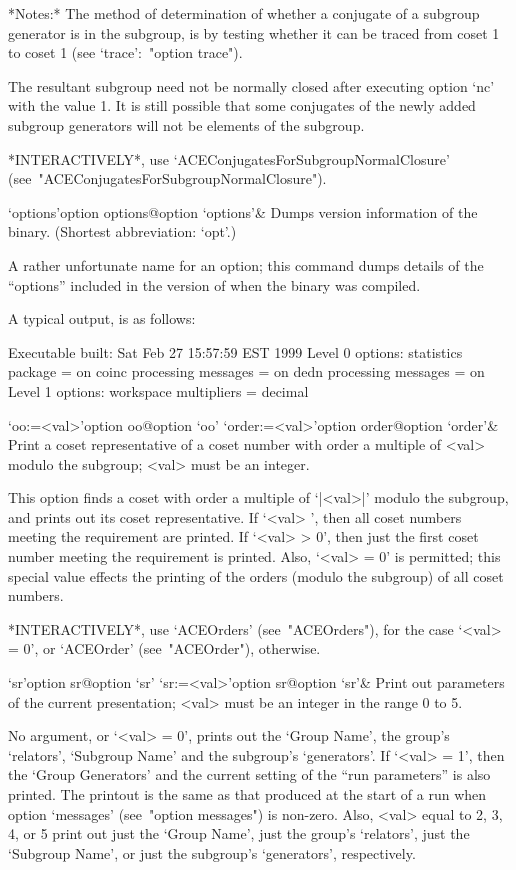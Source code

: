 *Notes:*
The method of determination of  whether  a  conjugate  of  a  subgroup
generator is in the subgroup, is by testing whether it can  be  traced
from coset 1 to coset 1  (see  `trace':~"option trace").

The resultant subgroup need not be  normally  closed  after  executing
option `nc'  with  the  value  1.  It  is  still  possible  that  some
conjugates of the newly added subgroup generators will not be elements
of the subgroup.

*INTERACTIVELY*,      use      `ACEConjugatesForSubgroupNormalClosure'
(see~"ACEConjugatesForSubgroupNormalClosure").

\>`options'{option options}@{option `options'}&
Dumps version information of the {\ACE} binary.
(Shortest abbreviation: `opt'.)

A rather unfortunate name for an option; this command dumps details of
the ``options'' included in the version  of  {\ACE}  when  the  {\ACE}
binary was compiled.

A typical output, is as follows:

\begintt
Executable built:
  Sat Feb 27 15:57:59 EST 1999
Level 0 options:
  statistics package = on
  coinc processing messages = on
  dedn processing messages = on
Level 1 options:
  workspace multipliers = decimal
\endtt

\>`oo:=<val>'{option oo}@{option `oo'}
\>`order:=<val>'{option order}@{option `order'}&
Print a coset representative of a coset number with order  a  multiple
of <val> modulo the subgroup; <val> must be an integer.

This option finds a coset with order a multiple  of  `|<val>|'  modulo
the subgroup, and prints out its coset representative.  If  `<val>  ', then all coset numbers meeting the  requirement  are  printed.  If
`<val> > 0', then just the first coset number meeting the  requirement
is printed. Also, `<val> = 0' is permitted; this special value effects
the printing of the orders (modulo the subgroup) of all coset numbers.

*INTERACTIVELY*,  use  `ACEOrders'  (see~"ACEOrders"),  for  the  case
`<val> = 0', or `ACEOrder' (see~"ACEOrder"), otherwise.

\>`sr'{option sr}@{option `sr'}
\>`sr:=<val>'{option sr}@{option `sr'}&
Print out parameters of the current presentation;  <val>  must  be  an
integer in the range 0 to 5.

No argument, or `<val> = 0', prints out the `Group Name', the  group's
`relators', `Subgroup Name' and the subgroup's `generators'. If `<val>
= 1', then the `Group Generators' and the current setting of the ``run
parameters'' is also  printed.  The  printout  is  the  same  as  that
produced at the start of a run  when  option  `messages'  (see~"option
messages") is non-zero. Also, <val> equal to 2, 3, 4, or 5  print  out
just the `Group Name', just the group's `relators', just the `Subgroup
Name', or just the subgroup's `generators', respectively.

